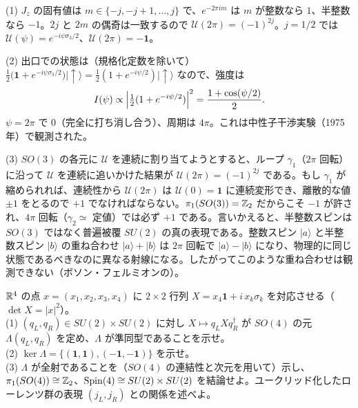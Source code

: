 \begin{solution}
(1) $J_z$ の固有値は $m\in\{-j,-j+1,\dots,j\}$ で、$e^{-2\pi im}$ は $m$ が整数なら $1$、半整数なら $-1$。$2j$ と $2m$ の偶奇は一致するので $\mathcal U(2\pi)=(-1)^{2j}$。$j=1/2$ では $\mathcal U(\psi)=e^{-i\psi\sigma_3/2}$、$\mathcal U(2\pi)=-\mathbf 1$。

(2) 出口での状態は（規格化定数を除いて）$\tfrac12\bigl(\mathbf 1+e^{-i\psi\sigma_3/2}\bigr)\lvert\uparrow\rangle=\tfrac12(1+e^{-i\psi/2})\lvert\uparrow\rangle$ なので、強度は
\[
I(\psi)\propto\Bigl\lvert\tfrac12(1+e^{-i\psi/2})\Bigr\rvert^2=\frac{1+\cos(\psi/2)}{2}.
\]
$\psi=2\pi$ で $0$（完全に打ち消し合う）、周期は $4\pi$。これは中性子干渉実験（1975年）で観測された。

(3) $SO(3)$ の各元に $\mathcal U$ を連続に割り当てようとすると、ループ $\gamma_1$（$2\pi$ 回転）に沿って $\mathcal U$ を連続に追いかけた結果が $\mathcal U(2\pi)=(-1)^{2j}$ である。もし $\gamma_1$ が縮められれば、連続性から $\mathcal U(2\pi)$ は $\mathcal U(0)=\mathbf 1$ に連続変形でき、離散的な値 $\pm1$ をとるので $+1$ でなければならない。$\pi_1(SO(3))=\mathbb{Z}_2$ だからこそ $-1$ が許され、$4\pi$ 回転（$\gamma_2\simeq$ 定値）では必ず $+1$ である。言いかえると、半整数スピンは $SO(3)$ ではなく普遍被覆 $SU(2)$ の真の表現である。整数スピン $\lvert a\rangle$ と半整数スピン $\lvert b\rangle$ の重ね合わせ $\lvert a\rangle+\lvert b\rangle$ は $2\pi$ 回転で $\lvert a\rangle-\lvert b\rangle$ になり、物理的に同じ状態であるべきなのに異なる射線になる。したがってこのような重ね合わせは観測できない（ボソン・フェルミオンの）。
\end{solution}

\begin{problem}[難易度 B]\label{ch02-prob-spin4}
$\mathbb{R}^4$ の点 $x=(x_1,x_2,x_3,x_4)$ に $2\times2$ 行列 $X=x_4\mathbf 1+i\,x_k\sigma_k$ を対応させる（$\det X=\lvert x\rvert^2$）。\\
(1) $(q_L,q_R)\in SU(2)\times SU(2)$ に対し $X\mapsto q_LXq_R^\dagger$ が $SO(4)$ の元 $\Lambda(q_L,q_R)$ を定め、$\Lambda$ が準同型であることを示せ。\\
(2) $\ker\Lambda=\{(\mathbf 1,\mathbf 1),(-\mathbf 1,-\mathbf 1)\}$ を示せ。\\
(3) $\Lambda$ が全射であることを（$SO(4)$ の連結性と次元を用いて）示し、$\pi_1(SO(4))\cong\mathbb{Z}_2$、$\operatorname{Spin}(4)\cong SU(2)\times SU(2)$ を結論せよ。ユークリッド化したローレンツ群の表現 $(j_L,j_R)$ との関係を述べよ。
\end{problem}

